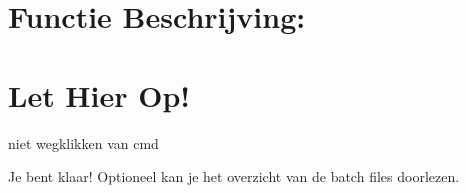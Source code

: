 \documentclass{article}
\begin{document}
\begin{center}
\scalebox{0.7}{
  
}
\end{center}

\section*{Functie Beschrijving:}



\section*{Let Hier Op!}
niet wegklikken van cmd




Je bent klaar! Optioneel kan je het overzicht van de batch files doorlezen.\\
\end{document}
